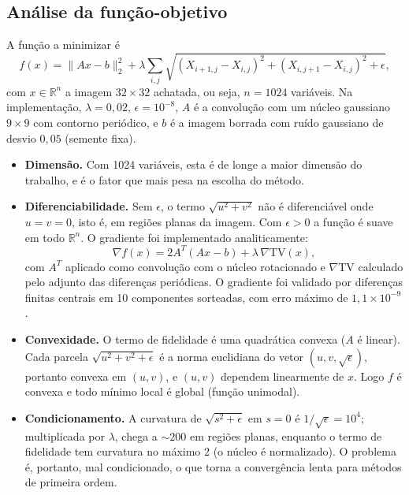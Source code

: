 \documentclass[12pt,a4paper]{article}
\newcommand{\R}{\mathbb{R}}
\begin{document}
\subsection{Análise da função-objetivo}

A função a minimizar é
\begin{equation}
f(x) = \|Ax-b\|_2^2 + \lambda \sum_{i,j}\sqrt{(X_{i+1,j}-X_{i,j})^2+(X_{i,j+1}-X_{i,j})^2+\epsilon},
\end{equation}
com $x\in\R^{n}$ a imagem $32\times32$ achatada, ou seja, $n=1024$ variáveis. Na implementação, $\lambda=0{,}02$, $\epsilon=10^{-8}$, $A$ é a convolução com um núcleo gaussiano $9\times9$ com contorno periódico, e $b$ é a imagem borrada com ruído gaussiano de desvio $0{,}05$ (semente fixa).

\begin{itemize}
  \item \textbf{Dimensão.} Com 1024 variáveis, esta é de longe a maior dimensão do trabalho, e é o fator que mais pesa na escolha do método.
  \item \textbf{Diferenciabilidade.} Sem $\epsilon$, o termo $\sqrt{u^2+v^2}$ não é diferenciável onde $u=v=0$, isto é, em regiões planas da imagem. Com $\epsilon>0$ a função é suave em todo $\R^n$. O gradiente foi implementado analiticamente:
  \begin{equation}
  \nabla f(x) = 2A^T(Ax-b) + \lambda\, \nabla\mathrm{TV}(x),
  \end{equation}
  com $A^T$ aplicado como convolução com o núcleo rotacionado e $\nabla\mathrm{TV}$ calculado pelo adjunto das diferenças periódicas. O gradiente foi validado por diferenças finitas centrais em 10 componentes sorteadas, com erro máximo de $1{,}1\times10^{-9}$.
  \item \textbf{Convexidade.} O termo de fidelidade é uma quadrática convexa ($A$ é linear). Cada parcela $\sqrt{u^2+v^2+\epsilon}$ é a norma euclidiana do vetor $(u,v,\sqrt\epsilon)$, portanto convexa em $(u,v)$, e $(u,v)$ dependem linearmente de $x$. Logo $f$ é convexa e todo mínimo local é global (função unimodal).
  \item \textbf{Condicionamento.} A curvatura de $\sqrt{s^2+\epsilon}$ em $s=0$ é $1/\sqrt\epsilon = 10^4$; multiplicada por $\lambda$, chega a $\sim 200$ em regiões planas, enquanto o termo de fidelidade tem curvatura no máximo 2 (o núcleo é normalizado). O problema é, portanto, mal condicionado, o que torna a convergência lenta para métodos de primeira ordem.
\end{itemize}
\end{document}
